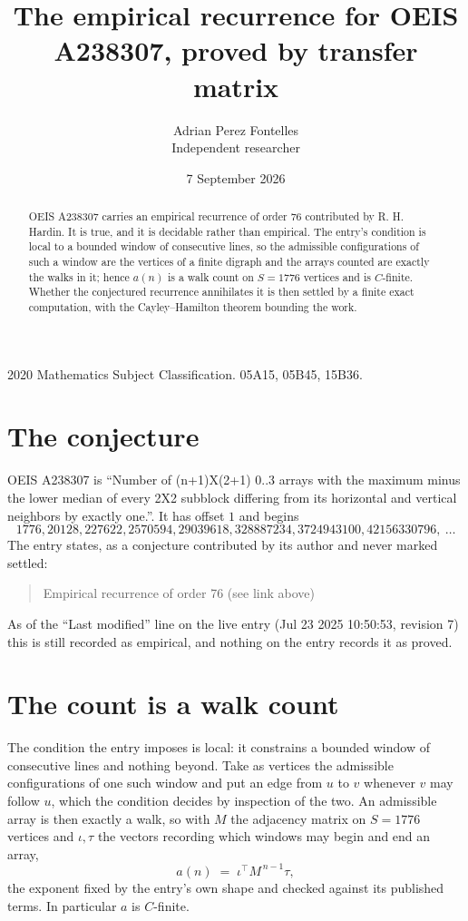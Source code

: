 \documentclass[11pt,a4paper]{article}
\title{The empirical recurrence for OEIS A238307, proved by transfer matrix}
\author{Adrian Perez Fontelles\\ \small Independent researcher}
\date{7 September 2026}
\theoremstyle{plain}
\theoremstyle{definition}
\begin{document}
\maketitle

\begin{abstract}
OEIS A238307 carries an empirical recurrence of order $76$ contributed by R. H. Hardin. It is
true, and it is decidable rather than empirical. The entry's condition is local to a bounded window of consecutive lines, so
the admissible configurations of such a window are the vertices of a finite digraph and the
arrays counted are exactly the walks in it; hence $a(n)$ is a walk count on $S=1776$ vertices
and is $C$-finite. Whether the conjectured recurrence annihilates it is then settled by a
finite exact computation, with the Cayley--Hamilton theorem bounding the work.
\end{abstract}

\noindent\small 2020 Mathematics Subject Classification. 05A15, 05B45, 15B36.\normalsize

\section{The conjecture}

OEIS A238307 is ``Number of (n+1)X(2+1) 0..3 arrays with the maximum minus the lower median of every 2X2 subblock differing from its horizontal and vertical neighbors by exactly one.''. It has offset $1$ and begins
\[
1776, 20128, 227622, 2570594, 29039618, 328887234, 3724943100, 42156330796,\ \dots
\]
The entry states, as a conjecture contributed by its author and never marked settled:
\begin{quote}
Empirical recurrence of order 76 (see link above)
\end{quote}
As of the ``Last modified'' line on the live entry (Jul 23 2025 10:50:53, revision 7) this is still
recorded as empirical, and nothing on the entry records it as proved.

\section{The count is a walk count}

The condition the entry imposes is local: it constrains a bounded window of consecutive lines and nothing beyond. Take as
vertices the admissible configurations of one such window and put an edge from $u$ to $v$
whenever $v$ may follow $u$, which the condition decides by inspection of the two. An
admissible array is then exactly a walk, so with $M$ the adjacency matrix on $S=1776$ vertices
and $\iota,\tau$ the vectors recording which windows may begin and end an array,
\[
a(n)\;=\;\iota^{\!\top}M^{\,n-1}\tau ,
\]
the exponent fixed by the entry's own shape and checked against its published terms. In
particular $a$ is $C$-finite.
\end{document}
